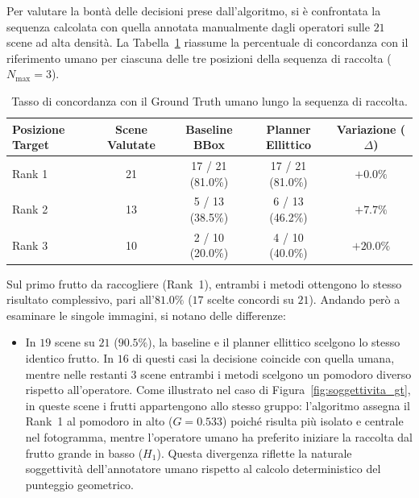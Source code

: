 Per valutare la bontà delle decisioni prese dall'algoritmo, si è confrontata 
la sequenza calcolata con quella annotata manualmente dagli operatori sulle 
$21$ scene ad alta densità. La Tabella~\ref{tab:benchmark_ground_truth} 
riassume la percentuale di concordanza con il riferimento umano per ciascuna 
delle tre posizioni della sequenza di raccolta ($N_{\max} = 3$).

\begin{table}[htbp]
    \centering
    \small
    \caption{Tasso di concordanza con il Ground Truth umano lungo la sequenza 
    di raccolta.}
    \label{tab:benchmark_ground_truth}
    \begin{tabular}{lcccc}
        \toprule
        \textbf{Posizione Target} & \textbf{Scene Valutate} & 
        \textbf{Baseline BBox} & \textbf{Planner Ellittico} & 
        \textbf{Variazione ($\Delta$)} \\
        \midrule
        Rank 1 & 21 & 17 / 21 (81.0\%) & 17 / 21 (81.0\%) & $+0.0\%$ \\
        Rank 2 & 13 & 5 / 13 (38.5\%)  & 6 / 13 (46.2\%)  & $+7.7\%$ \\
        Rank 3 & 10 & 2 / 10 (20.0\%)  & 4 / 10 (40.0\%)  & $+20.0\%$ \\
        \bottomrule
    \end{tabular}
\end{table}

Sul primo frutto da raccogliere (Rank~1), entrambi i metodi ottengono lo 
stesso risultato complessivo, pari all'$81.0\%$ ($17$ scelte concordi su $21$). 
Andando però a esaminare le singole immagini, si notano delle differenze:
\begin{itemize}
    \item In $19$ scene su $21$ ($90.5\%$), la baseline e il planner ellittico 
    scelgono lo stesso identico frutto. In $16$ di questi casi la decisione 
    coincide con quella umana, mentre nelle restanti $3$ scene entrambi i metodi 
    scelgono un pomodoro diverso rispetto all'operatore. Come illustrato nel caso 
    di Figura~\ref{fig:soggettivita_gt}, in queste scene i frutti appartengono 
    allo stesso gruppo: l'algoritmo assegna il Rank~1 al pomodoro in alto 
    ($G = 0.533$) poiché risulta più isolato e centrale nel fotogramma, 
    mentre l'operatore umano ha preferito iniziare la raccolta dal frutto grande 
    in basso ($H_1$). Questa divergenza riflette la naturale soggettività 
    dell'annotatore umano rispetto al calcolo deterministico del punteggio geometrico.
\end{itemize}

